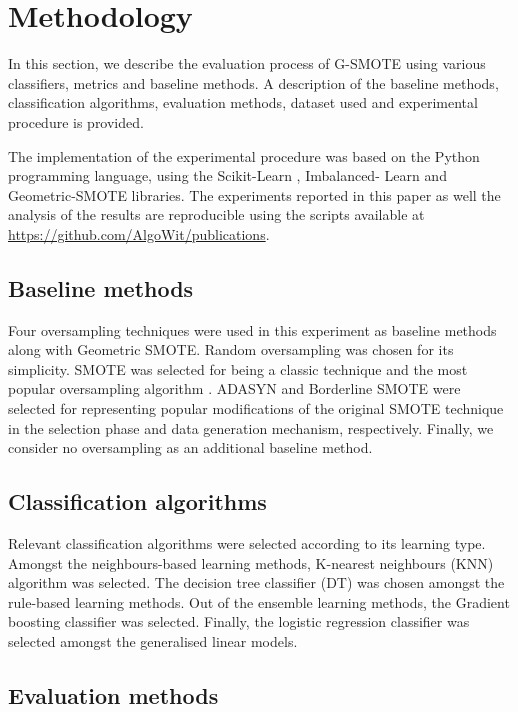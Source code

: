 \documentclass[parskip=full]{scrartcl}
\begin{document}
\section{Methodology}

In this section, we describe the evaluation process of G-SMOTE using various
classifiers, metrics and baseline methods. A description of the baseline
methods, classification algorithms, evaluation methods, dataset used and
experimental procedure is provided.

The implementation of the experimental procedure was based on the Python
programming language, using the Scikit-Learn \cite{Pedregosa2011}, Imbalanced-
Learn \cite{JMLR:v18:16-365} and Geometric-SMOTE \cite{Douzas2019} libraries.
The experiments reported in this paper as well the analysis of the results are
reproducible using the scripts available at \url{https://github.com/AlgoWit/publications}.

\subsection{Baseline methods}

Four oversampling techniques were used in this experiment
as baseline methods along with Geometric SMOTE. Random oversampling was chosen
for its simplicity. SMOTE was selected for being a classic technique and the
most popular oversampling algorithm \cite{Douzas2019}. ADASYN and Borderline
SMOTE were selected for representing popular modifications of the original
SMOTE technique in the selection phase and data generation mechanism,
respectively. Finally, we consider no oversampling as an additional baseline
method.

\subsection{Classification algorithms}

Relevant classification algorithms were selected according to its learning
type. Amongst the neighbours-based learning methods, K-nearest neighbours (KNN)
 algorithm was selected. The decision tree classifier
(DT)  was chosen amongst the rule-based learning
methods. Out of the ensemble learning methods, the Gradient boosting classifier
 was selected. Finally, the logistic regression
classifier  was selected amongst the generalised linear
models.

\subsection{Evaluation methods}
\end{document}
